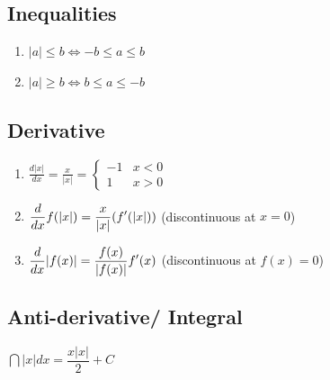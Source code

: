 \subsection*{Inequalities} \label{Basic Functions/Absolute Value function or Modulus Function/Inequalities}

\begin{enumerate}
    \item ${\displaystyle |a|\leq b\iff -b\leq a\leq b}$

    \item ${\displaystyle |a|\geq b\iff b\leq a\leq -b\ }$

\end{enumerate}

\subsection*{Derivative} \label{Basic Functions/Absolute Value function or Modulus Function/Derivative}

\begin{enumerate}
    \item $
        {\displaystyle {\frac {d\left|x\right|}{dx}}={\frac {x}{|x|}}={\begin{cases}-1&x<0\\1&x>0\end{cases}}}
    $

    \item $
        {\displaystyle {d \over dx}f(|x|)={x \over |x|}(f'(|x|))}
    $ \hfill (discontinuous at $x=0$)

    \item $
        {\displaystyle {d \over dx}|f(x)|={f(x) \over |f(x)|}f'(x)}
    $ \hfill (discontinuous at $f(x)=0$)
\end{enumerate}


\subsection*{Anti-derivative/ Integral} \label{Basic Functions/Absolute Value function or Modulus Function/Anti-derivative or Integral}

$
    {\displaystyle \dint \left|x\right|dx={\dfrac {x\left|x\right|}{2}}+C}
$



